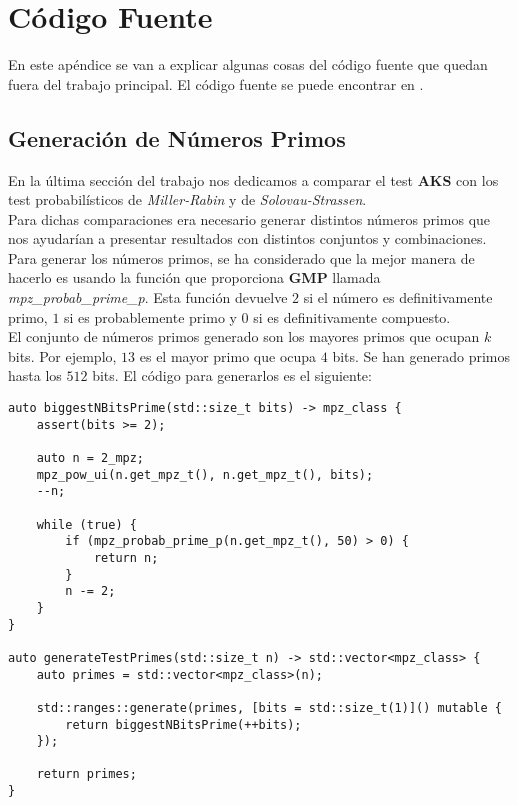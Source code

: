 
\chapter{Código Fuente}\label{codigo_fuente}

En este apéndice se van a explicar algunas cosas del código fuente que quedan fuera del trabajo principal. El código fuente se puede encontrar en \cite{fgallego_tfg_github}.

\section{Generación de Números Primos}

En la última sección del trabajo nos dedicamos a comparar el test \textbf{AKS} con los test probabilísticos de \textit{Miller-Rabin} y de \textit{Solovau-Strassen}.\\

Para dichas comparaciones era necesario generar distintos números primos que nos ayudarían a presentar resultados con distintos conjuntos y combinaciones. Para generar los números primos, se ha considerado que la mejor manera de hacerlo es usando la función que proporciona \textbf{GMP} llamada \textit{mpz\_probab\_prime\_p}. Esta función devuelve $2$ si el número es definitivamente primo, $1$ si es probablemente primo y $0$ si es definitivamente compuesto.\\

El conjunto de números primos generado son los mayores primos que ocupan $k$ bits. Por ejemplo, $13$ es el mayor primo que ocupa $4$ bits. Se han generado primos hasta los $512$ bits. El código para generarlos es el siguiente:

\begin{lstlisting}
auto biggestNBitsPrime(std::size_t bits) -> mpz_class {
	assert(bits >= 2);

	auto n = 2_mpz;
	mpz_pow_ui(n.get_mpz_t(), n.get_mpz_t(), bits);
	--n;

	while (true) {
		if (mpz_probab_prime_p(n.get_mpz_t(), 50) > 0) {
			return n;
		}
		n -= 2;
	}
}

auto generateTestPrimes(std::size_t n) -> std::vector<mpz_class> {
	auto primes = std::vector<mpz_class>(n);

	std::ranges::generate(primes, [bits = std::size_t(1)]() mutable {
		return biggestNBitsPrime(++bits);
	});

	return primes;
}
\end{lstlisting}

